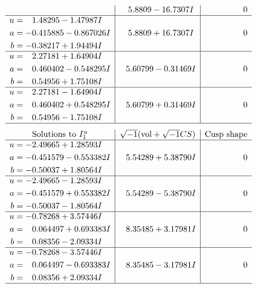 \documentclass[1p]{elsarticle_modified}
\theoremstyle{definition}
\newcommand{\I}{\sqrt{-1}}
\begin{document}
$$\begin{array}{c|c|c}
 & \phantom{-}5.8809 - 16.7307 I & \phantom{-0.000000 } 0 \\ \hline\begin{aligned}
u &= \phantom{-}1.48295 - 1.47987 I \\
a &= -0.415885 - 0.867026 I \\
b &= -0.38217 + 1.94494 I\end{aligned}
 & \phantom{-}5.8809 + 16.7307 I & \phantom{-0.000000 } 0 \\ \hline\begin{aligned}
u &= \phantom{-}2.27181 + 1.64904 I \\
a &= \phantom{-}0.460402 - 0.548295 I \\
b &= \phantom{-}0.54956 + 1.75108 I\end{aligned}
 & \phantom{-}5.60799 - 0.31469 I & \phantom{-0.000000 } 0 \\ \hline\begin{aligned}
u &= \phantom{-}2.27181 - 1.64904 I \\
a &= \phantom{-}0.460402 + 0.548295 I \\
b &= \phantom{-}0.54956 - 1.75108 I\end{aligned}
 & \phantom{-}5.60799 + 0.31469 I & \phantom{-0.000000 } 0\\
 \hline 
 \end{array}$$\newpage$$\begin{array}{c|c|c}  
\text{Solutions to }I^u_{1}& \I (\text{vol} + \sqrt{-1}CS) & \text{Cusp shape}\\
 \hline 
\begin{aligned}
u &= -2.49665 + 1.28593 I \\
a &= -0.451579 - 0.553382 I \\
b &= -0.50037 + 1.80564 I\end{aligned}
 & \phantom{-}5.54289 + 5.38790 I & \phantom{-0.000000 } 0 \\ \hline\begin{aligned}
u &= -2.49665 - 1.28593 I \\
a &= -0.451579 + 0.553382 I \\
b &= -0.50037 - 1.80564 I\end{aligned}
 & \phantom{-}5.54289 - 5.38790 I & \phantom{-0.000000 } 0 \\ \hline\begin{aligned}
u &= -0.78268 + 3.57446 I \\
a &= \phantom{-}0.064497 + 0.693383 I \\
b &= \phantom{-}0.08356 - 2.09334 I\end{aligned}
 & \phantom{-}8.35485 + 3.17981 I & \phantom{-0.000000 } 0 \\ \hline\begin{aligned}
u &= -0.78268 - 3.57446 I \\
a &= \phantom{-}0.064497 - 0.693383 I \\
b &= \phantom{-}0.08356 + 2.09334 I\end{aligned}
 & \phantom{-}8.35485 - 3.17981 I & \phantom{-0.000000 } 0\\
 \hline 
 \end{array}$$\newpage\newpage\renewcommand{\arraystretch}{1}
\end{document}
